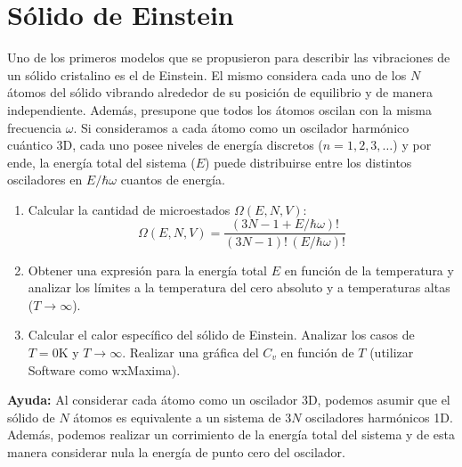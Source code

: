 \documentclass[a4paper,11pt]{article}
\begin{document}
\section{Sólido de Einstein}

Uno de los primeros modelos que se propusieron para describir las vibraciones 
de un sólido cristalino es el de Einstein. El mismo considera cada uno de los 
$N$ átomos del sólido vibrando alrededor de su posición de equilibrio y de 
manera independiente. Además, presupone que todos los átomos oscilan con la 
misma frecuencia $\omega$. Si consideramos a cada átomo como un oscilador 
harmónico cuántico 3D, cada uno posee niveles de energía discretos
($n = 1, 2, 3, \dots$) y por ende, la energía total del sistema ($E$) puede 
distribuirse entre los distintos osciladores en $E/\hbar\omega$ 
cuantos de energía.

\begin{enumerate}[label=(\alph*),
                  leftmargin=2\parindent,
                  rightmargin=2\parindent]

    \item{Calcular la cantidad de microestados $\Omega(E, N, V)$:\\
          $$\Omega(E, N, V) =
          \frac{(3N - 1 + E/\hbar\omega)!}{(3N - 1)! \, (E/\hbar\omega)!}$$
          }

    \item{Obtener una expresión para la energía total $E$ en función 
          de la temperatura y analizar los límites a la temperatura del 
          cero absoluto y a temperaturas altas ($T \rightarrow \infty$).
          }

    \item{Calcular el calor específico del sólido de Einstein.
          Analizar los casos de $T=0 \text{K}$ y $T \rightarrow \infty$.
          Realizar una gráfica del $C_v$ en función de $T$
          (utilizar Software como wxMaxima).
          }
\end{enumerate}

{\small
\textbf{Ayuda:} Al considerar cada átomo como un oscilador 3D, podemos asumir
que el sólido de $N$ átomos es equivalente a un sistema de $3N$ osciladores
harmónicos 1D. Además, podemos realizar un corrimiento de la energía total
del sistema y de esta manera considerar nula la energía de punto cero del
oscilador.
}
\end{document}
